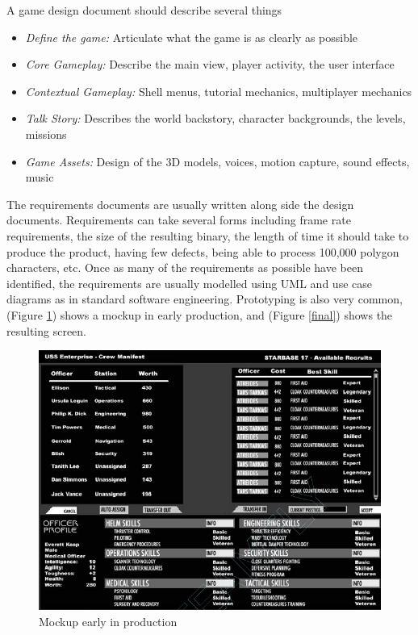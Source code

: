A game design document should describe several things\cite{bethke2003game}
\begin{itemize}
	\item \emph{Define the game:} Articulate what the game is as clearly as possible
	\item \emph{Core Gameplay:} Describe the main view, player activity, the user interface
	\item \emph{Contextual Gameplay:} Shell menus, tutorial mechanics, multiplayer mechanics
	\item \emph{Talk Story:} Describes the world backstory, character backgrounds, the levels, missions
	\item \emph{Game Assets:} Design of the 3D models, voices, motion capture, sound effects, music
\end{itemize}

The requirements documents are usually written along side the design documents. Requirements can take several forms including\cite{bethke2003game} frame rate requirements, the size of the resulting binary, the length of time it should take to produce the product, having few defects, being able to process 100,000 polygon characters, etc. Once as many of the requirements as possible have been identified, the requirements are usually modelled using UML and use case diagrams as in standard software engineering. Prototyping is also very common, (Figure \ref{mockup}) shows a mockup in early production, and (Figure \ref{final}) shows the resulting screen.

\begin{figure}[htb]
	\includegraphics[scale=0.5]{Images/mockup}
	\caption{Mockup early in production \cite{bethke2003game}}
	\label{mockup}
\end{figure}

